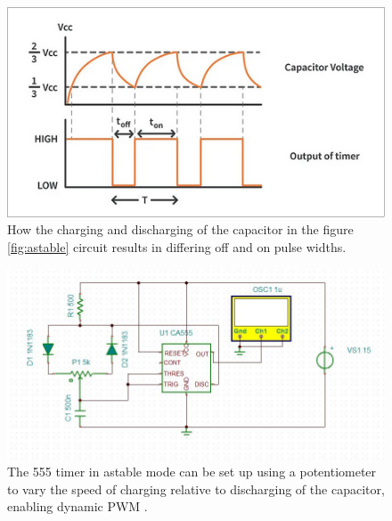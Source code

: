 \documentclass[%
 reprint,
 amsmath,amssymb,
 aps,
]{revtex4-2}
\begin{document}
        \begin{figure}
        \includegraphics[width=0.9\columnwidth]{Images/astableCapacitor.png}
        \caption{\label{fig:astableCapacitor}How the charging and discharging of the capacitor in the figure \ref{fig:astable} circuit results in differing off and on pulse widths.}
        \end{figure}

        \begin{figure}
        \includegraphics[width=1.6\columnwidth]{Images/potentiometer}
        \caption{\label{fig:potentiometer}The 555 timer in astable mode can be set up using a potentiometer to vary the speed of charging relative to discharging of the capacitor, enabling dynamic PWM \cite{ucd}.}
        \end{figure}
\end{document}

